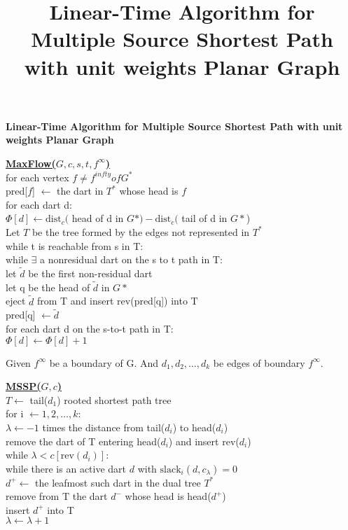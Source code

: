 \documentclass{article}
\begin{document}
\title{Linear-Time Algorithm for Multiple Source Shortest Path with unit weights Planar Graph}

\begin{center}
\textbf{\Large Linear-Time Algorithm for Multiple Source Shortest Path with unit weights Planar Graph}
\end{center}

\begin{algorithm}
\textbf{\underline{MaxFlow($G,c, s, t, f^{\infty} $)}} \\
for each vertex $f \neq f^{infty} of G^*$ \\ \quad
   pred[$f$] $\leftarrow$ the dart in $T^*$ whose head is $f$ \\
for each dart d: \\ \quad
   $\Phi[d] \leftarrow \text{dist}_c($ head of d in $G*) - \text{dist}_c($ tail of d in $G*$) \\
Let $T$ be the tree formed by the edges not represented in $T^*$ \\
while t is reachable from s in T: \\ \quad
   while $\exists$ a nonresidual dart on the s to t path in T: \\ \qquad
      let $\tilde d$ be the first non-residual dart \\ \qquad
      let q be the head of $\tilde d$ in $G*$ \\ \qquad
      eject $\tilde d$ from T and insert rev(pred[q]) into T \\ \qquad
      pred[q] $\leftarrow \tilde d$ \\ \quad
   for each dart d on the s-to-t path in T: \\ \qquad
      $\Phi[d] \leftarrow \Phi[d] + 1$
\end{algorithm}

Given $f^{\infty}$ be a boundary of G. And $d_1, d_2, \ldots, d_k$ be edges of boundary $f^{\infty}$.
\begin{algorithm}
\textbf{\underline{MSSP($G,c$)}} \\
$T \leftarrow $ tail($d_1$) rooted shortest path tree \\
for i $\leftarrow 1, 2, \ldots, k$: \\ \quad
   $\lambda \leftarrow -1$ times the distance from tail($d_i$) to head($d_i$) \\ \quad
   remove the dart of T entering head($d_i$) and insert rev($d_i$) \\ \quad
   while $\lambda < c[\text{rev}(d_i)]$: \\ \qquad
      while there is an active dart $d$ with $\text{slack}_i(d, c_{\lambda}) = 0$ \\ \qquad \quad
      $d^{+} \leftarrow$ the leafmost such dart in the dual tree $T^*$ \\ \qquad \quad
      remove from T the dart $d^{-}$ whose head is head($d^{+}$) \\ \qquad \quad
      insert $d^{+}$ into T \\ \qquad
   $\lambda \leftarrow \lambda + 1$
\end{algorithm}
\end{document}
